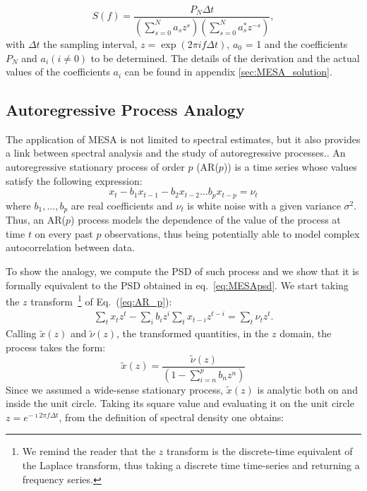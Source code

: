 \documentclass[twocolumn,showpacs,preprintnumbers,nofootinbib,prd,
superscriptaddress,10pt]{revtex4-1}
\begin{document}
\begin{equation}\label{eq:MESApsd}
    S(f) = \frac{P_N \Delta t}{\left(\sum_{s=0}^N a_s z^s\right)\left(\sum_{s = 0}^N a^*_s z^{-s}\right)}, 
\end{equation}
with $\Delta t$ the sampling interval, $z=\exp{(2\pi i f\Delta t)}$, $a_0$ = 1 and the coefficients $P_N$ and $a_i (i \neq 0)$ to be determined. The details of the derivation and the actual values of the coefficients $a_i$ can be found in appendix \ref{sec:MESA_solution}.

\subsection{Autoregressive Process Analogy} \label{sec:autoregr}

The application of MESA is not limited to spectral estimates, but it also provides a link between spectral analysis and the study
of autoregressive processes.\cite{doi:10.1029/RG013i001p00183}.
An autoregressive stationary process of order $p$ (AR($p$)) is a time series whose values satisfy the following expression: 
\begin{equation} \label{eq:AR_p}
    x_t - b_1 x_{t-1} - b_2 x_{t-2} \dots b_p x_{t - p} = \nu_t
\end{equation}
where $b_1, \ldots, b_p$ are real coefficients and $\nu_t$ is white noise with a given variance $\sigma^2$.
Thus, an AR($p$) process models the dependence of the value of the process at time $t$ on every past $p$ observations, 
thus being potentially able to model complex autocorrelation between data.
\par
To show the analogy, we compute the PSD of such process and we show that it is formally equivalent to the PSD obtained in eq.~\ref{eq:MESApsd}.
We start taking the $z$ transform~\footnote{We remind the reader that the $z$ transform is the discrete-time equivalent of the Laplace transform, thus taking a discrete time time-series and returning a frequency series.} of Eq.~(\ref{eq:AR_p}): 
\begin{align}
    \sum_t x_t z^t - \sum_i b_i z^i\sum_t x_{t - i} z^{t - i} = \sum_t \nu_t z^t.
\end{align}
Calling $\tilde x(z)$ and $\tilde \nu (z)$, the transformed quantities, 
in the $z$ domain, the process takes the form:
\begin{equation}
    \tilde x(z) = \frac{\tilde\nu(z)}{\left(1 - \sum_{i = n}^p b_n z^n \right)}
\end{equation}
Since we assumed a wide-sense stationary process, $\tilde{x}(z)$ is analytic both on and inside the unit circle. Taking its square value and evaluating it on the unit circle $z = e^{-\imath 2 \pi f \Delta t}$, from the definition of spectral density one obtains:
\end{document}
